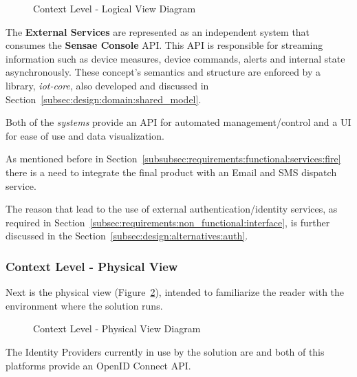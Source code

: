 \begin{figure}[H]
   \centering
   \resizebox{0.8\columnwidth}{!}
   {
      
   }
   \caption[Context Level - Logical View Diagram]{Context Level - Logical View Diagram}
   \label{fig:design:architecture:context:logical:diagram}
\end{figure}

The \textbf{External Services} are represented as an independent system that consumes the \textbf{Sensae Console} \gls{API}. This \gls{API} is responsible for streaming information such as device measures, device commands, alerts and internal state asynchronously. These concept's semantics and structure are enforced by a library, \textit{iot-core}, also developed and discussed in Section~\ref{subsec:design:domain:shared_model}.

Both of the \textit{systems} provide an \gls{API} for automated management/control and a \gls{UI} for ease of use and data visualization.

As mentioned before in Section~\ref{subsubsec:requirements:functional:services:fire} there is a need to integrate the final product with an Email and SMS dispatch service.

The reason that lead to the use of external authentication/identity services, as required in Section~\ref{subsec:requirements:non_functional:interface}, is further discussed in the Section~\ref{subsec:design:alternatives:auth}.

\subsubsection{Context Level - Physical View}
\label{subsubsec:design:architecture:context:physical}

Next is the physical view (Figure~\ref{fig:design:architecture:context:physical:diagram}), intended to familiarize the reader with the environment where the solution runs.

\begin{figure}[H]
   \centering
   \resizebox{\columnwidth}{!}
   {
      
   }
   \caption[Context Level - Physical View Diagram]{Context Level - Physical View Diagram}
   \label{fig:design:architecture:context:physical:diagram}
\end{figure}

The Identity Providers currently in use by the solution are \cite{googleid} and \cite{azureid} both of this platforms provide an OpenID Connect \gls{API}.

